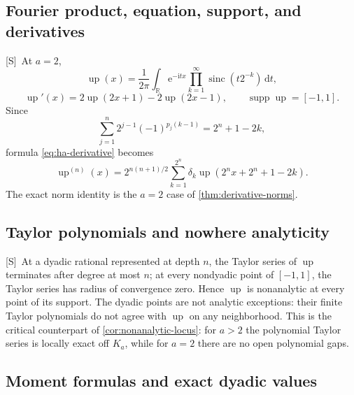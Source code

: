 \documentclass[11pt,oneside]{article}
\theoremstyle{definition}
\theoremstyle{remark}
\newcommand{\R}{\mathbb R}
\newcommand{\Up}{\operatorname{up}}
\newcommand{\sinc}{\operatorname{sinc}}
\newcommand{\e}{\mathrm e}
\newcommand{\ii}{\mathrm i}
\newcommand{\dd}{\,\mathrm d}
\newcommand{\supp}{\operatorname{supp}}
\newcommand{\Smark}{\textcolor{sourceblue}{\textsf{[S]}}}
\begin{document}
\subsection{Fourier product, equation, support, and derivatives}

\Smark\ At $a=2$,
\begin{equation}
 \Up(x)=\frac1{2\pi}\int_{\R}\e^{-\ii tx}
 \prod_{k=1}^{\infty}\sinc(t2^{-k})\dd t,
 \tag{S3.60}
 \label{eq:up-product}
\end{equation}
\begin{equation}
 \Up'(x)=2\Up(2x+1)-2\Up(2x-1),
 \qquad \supp\Up=[-1,1].
 \tag{S3.61--S3.62}
 \label{eq:up-equation}
\end{equation}
Since
\[
 \sum_{j=1}^{n}2^{j-1}(-1)^{p_j(k-1)}=2^n+1-2k,
\]
formula \eqref{eq:ha-derivative} becomes
\begin{equation}
 \Up^{(n)}(x)=2^{n(n+1)/2}
 \sum_{k=1}^{2^n}\delta_k\Up(2^nx+2^n+1-2k).
 \tag{S3.63}
 \label{eq:up-derivative}
\end{equation}
The exact norm identity is the $a=2$ case of \cref{thm:derivative-norms}.

\subsection{Taylor polynomials and nowhere analyticity}

\Smark\ At a dyadic rational represented at depth $n$, the Taylor series of $\Up$
terminates after degree at most $n$; at every nondyadic point of $[-1,1]$, the Taylor series has
radius of convergence zero.
Hence $\Up$ is nonanalytic at every point of its support.  The dyadic points are not analytic
exceptions: their finite Taylor polynomials do not agree with $\Up$ on any neighborhood.
This is the critical counterpart of \cref{cor:nonanalytic-locus}: for $a>2$ the polynomial
Taylor series is locally exact off $K_a$, while for $a=2$ there are no open polynomial gaps.

\subsection{Moment formulas and exact dyadic values}
\end{document}
